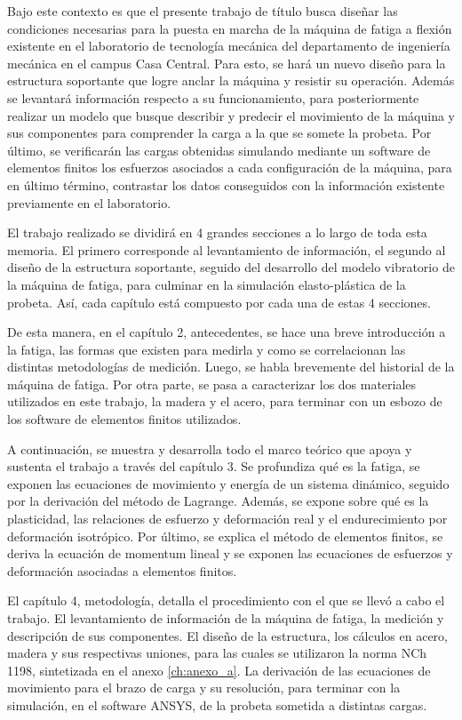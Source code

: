 Bajo este contexto es que el presente trabajo de título busca diseñar las condiciones necesarias para la puesta en marcha de la máquina de fatiga a flexión existente en el laboratorio de tecnología mecánica del departamento de ingeniería mecánica en el campus Casa Central. Para esto, se hará un nuevo diseño para la estructura soportante que logre anclar la máquina y resistir su operación. Además se levantará información respecto a su funcionamiento, para posteriormente realizar un modelo que busque describir y predecir el movimiento de la máquina y sus componentes para comprender la carga a la que se somete la probeta. Por último, se verificarán las cargas obtenidas simulando mediante un software de elementos finitos los esfuerzos asociados a cada configuración de la máquina, para en último término, contrastar los datos conseguidos con la información existente previamente en el laboratorio.

El trabajo realizado se dividirá en 4 grandes secciones a lo largo de toda esta memoria. El primero corresponde al levantamiento de información, el segundo al diseño de la estructura soportante, seguido del desarrollo del modelo vibratorio de la máquina de fatiga, para culminar en la simulación elasto-plástica de la probeta. Así, cada capítulo está compuesto por cada una de estas 4 secciones.

De esta manera, en el capítulo 2, antecedentes, se hace una breve introducción a la fatiga, las formas que existen para medirla y como se correlacionan  las distintas metodologías de medición. Luego, se habla brevemente del historial de la máquina de fatiga. Por otra parte, se pasa a caracterizar los dos materiales utilizados en este trabajo, la madera y el acero, para terminar con un esbozo de los software de elementos finitos utilizados.

A continuación, se muestra y desarrolla todo el marco teórico que apoya y sustenta el trabajo a través del capítulo 3. Se profundiza qué es la fatiga, se exponen las ecuaciones de movimiento y energía de un sistema dinámico, seguido por la derivación del método de Lagrange. Además, se expone sobre qué es la plasticidad, las relaciones de esfuerzo y deformación real y el endurecimiento por deformación isotrópico. Por último, se explica el método de elementos finitos, se deriva la ecuación de momentum lineal y se exponen las ecuaciones de esfuerzos y deformación asociadas a elementos finitos.

El capítulo 4, metodología, detalla el procedimiento con el que se llevó a cabo el trabajo. El levantamiento de información de la máquina de fatiga, la medición y descripción de sus componentes. El diseño de la estructura, los cálculos en acero, madera y sus respectivas uniones, para las cuales se utilizaron la norma NCh 1198, sintetizada en el anexo \ref{ch:anexo_a}. La derivación de las ecuaciones de movimiento para el brazo de carga y su resolución, para terminar con la simulación, en el software ANSYS, de la probeta sometida a distintas cargas.

